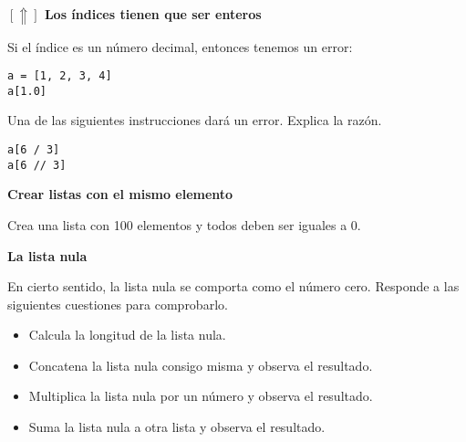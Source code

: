 \documentclass[a4paper, 11pt]{scrartcl}
\newenvironment{code}{\begin{tcolorbox}[colback=red!2!white]}{\end{tcolorbox}}
\begin{document}
\noindent\textbf{\sffamily \dag{}$[\Uparrow]$ Los índices tienen que ser enteros}

Si el índice es un número decimal, entonces tenemos un error:

\smallskip

\begin{code}

\begin{verbatim}
a = [1, 2, 3, 4]
a[1.0]
\end{verbatim}

\end{code}

Una de las siguientes instrucciones dará un error. Explica la razón.

\smallskip

\begin{code}

\begin{verbatim}
a[6 / 3]
a[6 // 3]
\end{verbatim}

\end{code}





\noindent\textbf{\sffamily Crear listas con el mismo elemento}

Crea una lista con 100 elementos y todos deben ser iguales a 0.





\noindent\textbf{\sffamily La lista nula}

En cierto sentido, la lista nula se comporta como el número cero. Responde a las siguientes cuestiones para comprobarlo.

\begin{itemize}

\item  Calcula la longitud de la lista nula.

\item  Concatena la lista nula consigo misma y observa el resultado.

\item Multiplica la lista nula por un número y observa el resultado.

\item Suma la lista nula a otra lista y observa el resultado.

\end{itemize}
\end{document}
